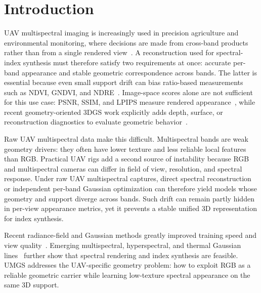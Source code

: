 ﻿\section{Introduction}

UAV multispectral imaging is increasingly used in precision agriculture and environmental monitoring, where decisions are made from cross-band products rather than from a single rendered view~\cite{colomina2014uav,turner2014uav,zhang2019uavreview,mathews2018uav}. A reconstruction used for spectral-index synthesis must therefore satisfy two requirements at once: accurate per-band appearance and stable geometric correspondence across bands. The latter is essential because even small support drift can bias ratio-based measurements such as NDVI, GNDVI, and NDRE~\cite{rouse1974ndvi,gitelson1996gndvi,huete1988savi,goetz1985imaging,manolakis2016hyperspectral}. Image-space scores alone are not sufficient for this use case: PSNR, SSIM, and LPIPS measure rendered appearance~\cite{wang2004ssim,zhang2018lpips}, while recent geometry-oriented 3DGS work explicitly adds depth, surface, or reconstruction diagnostics to evaluate geometric behavior~\cite{huang20242dgs,guedon2024sugar,liu2024citygaussianv2}.

Raw UAV multispectral data make this difficult. Multispectral bands are weak geometry drivers: they often have lower texture and less reliable local features than RGB. Practical UAV rigs add a second source of instability because RGB and multispectral cameras can differ in field of view, resolution, and spectral response. Under raw UAV multispectral captures, direct spectral reconstruction or independent per-band Gaussian optimization can therefore yield models whose geometry and support diverge across bands. Such drift can remain partly hidden in per-view appearance metrics, yet it prevents a stable unified 3D representation for index synthesis.

Recent radiance-field and Gaussian methods greatly improved training speed and view quality~\cite{mildenhall2020nerf,barron2022mipnerf360,mueller2022instantngp,kerbl2023gaussiansplatting,yu2024mipsplatting,huang20242dgs}. Emerging multispectral, hyperspectral, and thermal Gaussian lines~\cite{meyerls2025mssplatting,thirgood2025hypergs,lu2024thermalgaussian,chen2024thermal3dgs} further show that spectral rendering and index synthesis are feasible. UMGS addresses the UAV-specific geometry problem: how to exploit RGB as a reliable geometric carrier while learning low-texture spectral appearance on the same 3D support.

